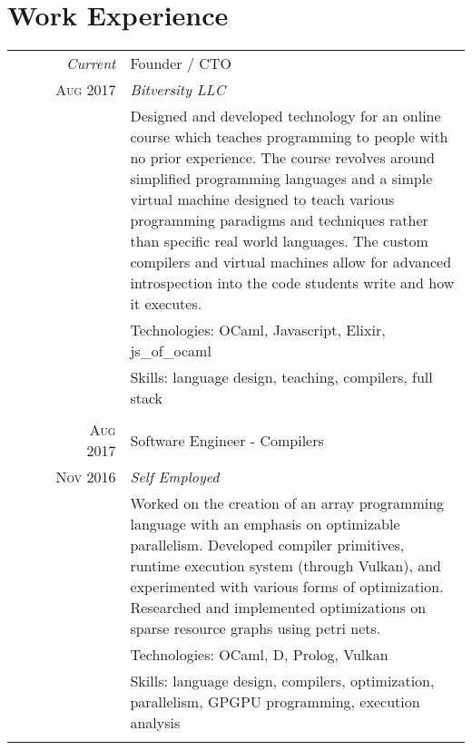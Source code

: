 \documentclass[a4paper,10pt]{article}
\begin{document}
\section{Work Experience}
\begin{tabular}{r|p{11cm}}
  \ \ \ \ \ \ \ \emph{Current}    & Founder / CTO\\
                \textsc{Aug 2017} & \emph{Bitversity LLC}\\
                                  & \footnotesize{Designed and developed technology for an online course which teaches programming to people with no prior experience. The course revolves around simplified programming languages and a simple virtual machine designed to teach various programming paradigms and techniques rather than specific real world languages. The custom compilers and virtual machines allow for advanced introspection into the code students write and how it executes.}\\
                                  & \footnotesize{Technologies: OCaml, Javascript, Elixir, js\_of\_ocaml}\\
                                  & \footnotesize{Skills: language design, teaching, compilers, full stack}\\
  \multicolumn{2}{c}{}\\

  \ \ \ \ \ \ \ \textsc{Aug 2017} & Software Engineer - Compilers\\
                \textsc{Nov 2016} & \emph{Self Employed}\\
                                  & \footnotesize{Worked on the creation of an array programming language with an emphasis on optimizable parallelism. Developed compiler primitives, runtime execution system (through Vulkan), and experimented with various forms of optimization. Researched and implemented optimizations on sparse resource graphs using petri nets.}\\
                                  & \footnotesize{Technologies: OCaml, D, Prolog, Vulkan}\\
                                  & \footnotesize{Skills: language design, compilers, optimization, parallelism, GPGPU programming, execution analysis}\\
  \multicolumn{2}{c}{}\\


\end{tabular}
\end{document}
